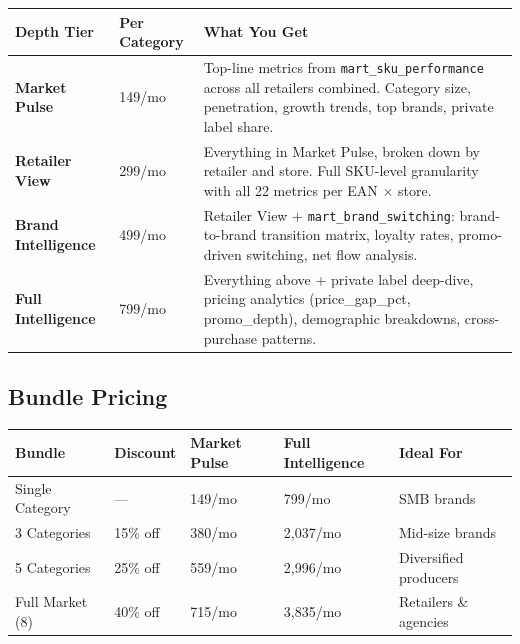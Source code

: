 \documentclass[11pt,a4paper]{article}
\begin{document}
\begin{center}
\renewcommand{\arraystretch}{1.4}
\begin{tabularx}{\textwidth}{L{2.8cm} R{2cm} L{8.5cm}}
\toprule
{}
\textbf{\color{white}Depth Tier} & \textbf{\color{white}Per Category} & \textbf{\color{white}What You Get} \\
\midrule
\textbf{Market Pulse} & \texteuro{}149/mo & Top-line metrics from \texttt{mart\_sku\_performance} across all retailers combined. Category size, penetration, growth trends, top brands, private label share. \\
\textbf{Retailer View} & \texteuro{}299/mo & Everything in Market Pulse, broken down by retailer and store. Full SKU-level granularity with all 22 metrics per EAN $\times$ store. \\
\textbf{Brand Intelligence} & \texteuro{}499/mo & Retailer View + \texttt{mart\_brand\_switching}: brand-to-brand transition matrix, loyalty rates, promo-driven switching, net flow analysis. \\
\textbf{Full Intelligence} & \texteuro{}799/mo & Everything above + private label deep-dive, pricing analytics (price\_gap\_pct, promo\_depth), demographic breakdowns, cross-purchase patterns. \\
\bottomrule
\end{tabularx}
\end{center}

\subsection{Bundle Pricing}

\begin{center}
\renewcommand{\arraystretch}{1.4}
\begin{tabularx}{\textwidth}{L{3cm} C{2cm} R{2.5cm} R{2.5cm} L{3cm}}
\toprule
{}
\textbf{\color{white}Bundle} & \textbf{\color{white}Discount} & \textbf{\color{white}Market Pulse} & \textbf{\color{white}Full Intelligence} & \textbf{\color{white}Ideal For} \\
\midrule
Single Category & --- & \texteuro{}149/mo & \texteuro{}799/mo & SMB brands \\
3 Categories & 15\% off & \texteuro{}380/mo & \texteuro{}2,037/mo & Mid-size brands \\
5 Categories & 25\% off & \texteuro{}559/mo & \texteuro{}2,996/mo & Diversified producers \\
Full Market (8) & 40\% off & \texteuro{}715/mo & \texteuro{}3,835/mo & Retailers \& agencies \\
\bottomrule
\end{tabularx}
\end{center}
\end{document}
